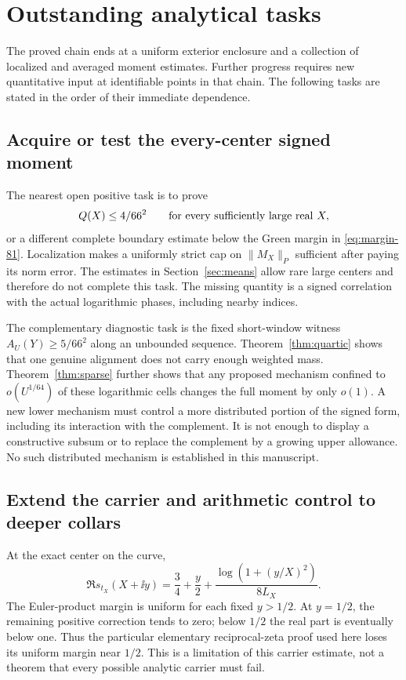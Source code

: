 \section{Outstanding analytical tasks}\label{sec:outstanding}

The proved chain ends at a uniform exterior enclosure and a collection
of localized and averaged moment estimates. Further progress requires
new quantitative input at identifiable points in that chain. The
following tasks are stated in the order of their immediate dependence.

\subsection{Acquire or test the every-center signed moment}

The nearest open positive task is to prove
\[
 Q(X)\le4/66^2\qquad\hbox{for every sufficiently large real }X,
\]
or a different complete boundary estimate below the Green margin in
\eqref{eq:margin-81}. Localization makes a uniformly strict cap on
$\|M_X\|_P$ sufficient after paying its norm error. The estimates in
Section~\ref{sec:means} allow rare large centers and therefore do not
complete this task. The missing quantity is a signed correlation with
the actual logarithmic phases, including nearby indices.

The complementary diagnostic task is the fixed short-window witness
$A_U(Y)\ge5/66^2$ along an unbounded sequence. Theorem~\ref{thm:quartic}
shows that one genuine alignment does not carry enough weighted mass.
Theorem~\ref{thm:sparse} further shows that any proposed mechanism
confined to $o(U^{1/64})$ of these logarithmic cells changes the full
moment by only $o(1)$. A new lower mechanism must control a more
distributed portion of the signed form, including its interaction
with the complement. It is not enough to display a constructive
subsum or to replace the complement by a growing upper allowance.
No such distributed mechanism is established in this manuscript.

\subsection{Extend the carrier and arithmetic control to deeper collars}

At the exact center on the curve,
\begin{equation}\label{eq:carrier-half}
 \Re s_{t_X}(X+\ii y)
 =\frac34+\frac y2+
          \frac{\log(1+(y/X)^2)}{8L_X}.
\end{equation}
The Euler-product margin is uniform for each fixed $y>1/2$.
At $y=1/2$, the remaining positive correction tends to zero;
below $1/2$ the real part is eventually below one. Thus the particular
elementary reciprocal-zeta proof used here loses its uniform margin
near $1/2$. This is a limitation of this carrier estimate, not a
theorem that every possible analytic carrier must fail.

